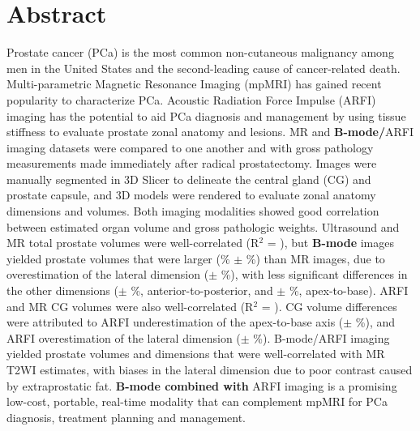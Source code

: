 \section*{Abstract}
Prostate cancer (PCa) is the most common non-cutaneous malignancy among men in
the United States and the second-leading cause of cancer-related death.
Multi-parametric Magnetic Resonance Imaging (mpMRI) has gained recent
popularity to characterize PCa.  Acoustic Radiation Force Impulse (ARFI)
imaging has the potential to aid PCa diagnosis and management by using tissue
stiffness to evaluate prostate zonal anatomy and lesions.  MR and
\textbf{B-mode/}ARFI \invivo imaging datasets were compared to one another and
with gross pathology measurements made immediately after radical prostatectomy.
Images were manually segmented in 3D Slicer to delineate the central gland (CG)
and prostate capsule, and 3D models were rendered to evaluate zonal anatomy
dimensions and volumes.  Both imaging modalities showed good correlation
between estimated organ volume and gross pathologic weights.  Ultrasound and MR
total prostate volumes were well-correlated (R$^2$ = \MRarfiVolTotalRsq), but
\textbf{B-mode} images yielded prostate volumes that were larger
(\MRarfiVolTotalMeanDiff\% $\pm$ \MRarfiVolTotalStdDiff\%) than MR images, due
to overestimation of the lateral dimension (\ARFImrTotalLatLatMeanPct $\pm$
\ARFImrTotalLatLatStdPct\%), with less significant differences in the other
dimensions (\ARFImrTotalAntPostMeanPct $\pm$ \ARFImrTotalAntPostStdPct\%,
anterior-to-posterior, and \ARFImrTotalApexBaseMeanPct $\pm$
\ARFImrTotalApexBaseStdPct\%, apex-to-base).  ARFI and MR CG volumes were also
well-correlated (R$^2$ = \MRarfiVolCentralRsq).  CG volume differences were
attributed to ARFI underestimation of the apex-to-base axis
(\ARFImrCentralApexBaseMeanPct $\pm$ \ARFImrCentralApexBaseStdPct\%), and ARFI
overestimation of the lateral dimension (\ARFImrCentralLatLatMeanPct $\pm$
\ARFImrCentralLatLatStdPct\%).  B-mode/ARFI imaging yielded prostate volumes
and dimensions that were well-correlated with MR T2WI estimates, with biases in
the lateral dimension due to poor contrast caused by extraprostatic fat.
\textbf{B-mode combined with} ARFI imaging is a promising low-cost, portable,
real-time modality that can complement mpMRI for PCa diagnosis, treatment
planning and management.
